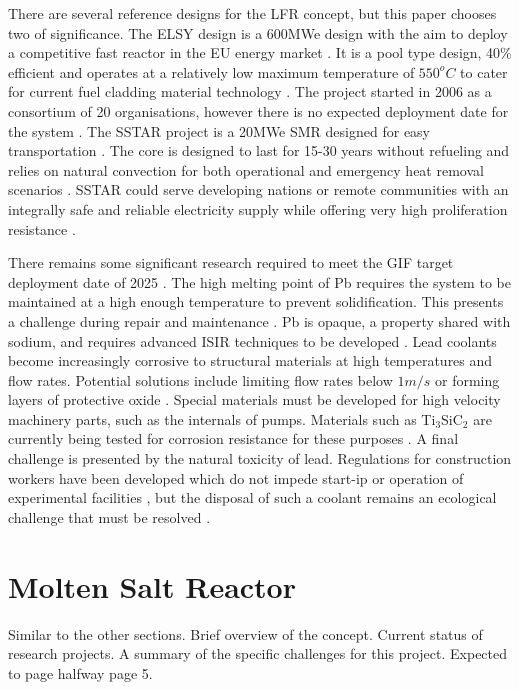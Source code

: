 \documentclass[journal]{IEEEtran}
\begin{document}
There are several reference designs for the LFR concept, but this paper chooses two of significance.
The ELSY design is a 600MWe design with the aim to deploy a competitive fast reactor in the EU energy market \cite{Locatelli2013}.
It is a pool type design, 40\% efficient and operates at a relatively low maximum temperature of $550^{o}C$ to cater for current fuel cladding material technology \cite{Int2012}.
The project started in 2006 as a consortium of 20 organisations, however there is no expected deployment date for the system \cite{GenIVForum}.
The SSTAR project is a 20MWe SMR designed for easy transportation \cite{GenIVForum}.
The core is designed to last for 15-30 years without refueling and relies on natural convection for both operational and emergency heat removal scenarios \cite{Int2012}.
SSTAR could serve developing nations or remote communities with an integrally safe and reliable electricity supply while offering very high proliferation resistance \cite{Int2012}.

There remains some significant research required to meet the GIF target deployment date of 2025 \cite{GenIVRoadmap}.
The high melting point of Pb requires the system to be maintained at a high enough temperature to prevent solidification. 
This presents a challenge during repair and maintenance \cite{GenIVForum}.
Pb is opaque, a property shared with sodium, and requires advanced ISIR techniques to be developed \cite{GenIVForum}.
Lead coolants become increasingly corrosive to structural materials at high temperatures and flow rates.
Potential solutions include limiting flow rates below $1m/s$ or forming layers of protective oxide \cite{Int2012}.
Special materials must be developed for high velocity machinery parts, such as the internals of pumps.
Materials such as Ti$_3$SiC$_2$ are currently being tested for corrosion resistance for these purposes \cite{Int2012}.
A final challenge is presented by the natural toxicity of lead.
Regulations for construction workers have been developed which do not impede start-ip or operation of experimental facilities \cite{Int2012}, but the disposal of such a coolant remains an ecological challenge that must be resolved \cite{Locatelli2013}.



\section{Molten Salt Reactor}
Similar to the other sections. 
Brief overview of the concept. 
Current status of research projects. 
A summary of the specific challenges for this project.
Expected to page halfway page 5.
\end{document}
